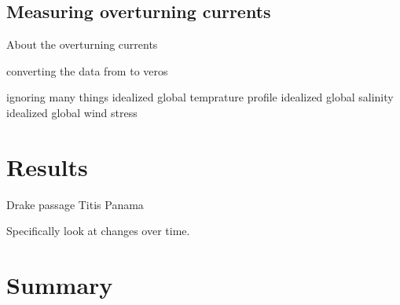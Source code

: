 \documentclass[a4paper]{article}
\begin{document}
\begin{multicols}{2}
\subsection{Measuring overturning currents}
About the overturning currents

converting the data from \cite{Muller2008Mar} to veros

ignoring many things
idealized global temprature profile
idealized global salinity
idealized global wind stress


\section{Results}

Drake passage
Titis
Panama

Specifically look at changes over time.

\section{Summary}


\printbibliography

\end{multicols}
\end{document}
